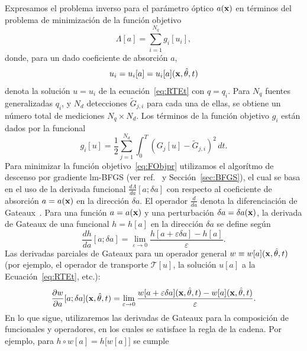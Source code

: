Expresamos el problema inverso para el parámetro óptico  $a(\mathbf{x})$ 
en términos del problema de minimización de la función objetivo
\begin{equation}
  \Lambda[a]=\sum_{i=1}^{N_q} g_i[u_i],
\label{eq:FObjpr}
\end{equation}
donde, para un dado coeficiente de absorción $a$,
\begin{equation}\label{ui_of_a}
  u_i = u_i[a] = u_i[a](\mathbf{x},\hat{\theta},t)
\label{eq:FObjpr2}
\end{equation}
denota la solución $u=u_i$ de la ecuación~\eqref{eq:RTEt} con $q=q_i$. Para $N_q$ fuentes generalizadas $q_i$, y $N_d$ 
detecciones $\tilde{G}_{j,i}$ para cada una de ellas, se obtiene un número 
total de mediciones $N_q \times N_d$. Los términos 
de la función objetivo $g_i$ están dados por la funcional 
\begin{equation}
  g_i[u] = \frac{1}{2} \sum_{j=1}^{N_d} \int_0^T (G_j[u]-\tilde
  {G}_{j,i})^2 \, dt.
\label{eq:FObj}
\end{equation}
Para minimizar la función objetivo~\eqref{eq:FObjpr} utilizamos el algorítmo 
de descenso por gradiente 
lm-BFGS (ver ref.~\cite{Byrd1995} y Sección~\ref{sec:BFGS}), 
el cual se basa en el uso de la derivada funcional $\frac{d\Lambda}{da} [a;\delta a]$ 
con respecto al coeficiente de absorción $a = a(\mathbf{x})$ en la dirección $\delta a$. 
El operador $\frac{d}{da}$ denota la diferenciación de Gateaux~\cite{Hille1974}. 
Para una función $a= a(\mathbf{x})$ y una perturbación $\delta a= \delta a(\mathbf{x})$, 
la derivada de Gateaux de una funcional $h = h[a]$ en la dirección $\delta a$ se define según
\begin{equation}\label{gateaux}
  \frac{dh}{da}[a; \delta a ] = \lim_{\varepsilon \to 0} \frac{h[a +\varepsilon \delta a]
    - h[a]}{\varepsilon}.
\end{equation}
Las derivadas parciales de Gateaux para un 
operador general $w \equiv w[a](\mathbf{x},\hat{\theta},t)$ (por ejemplo, el operador de transporte $\mathcal{T}[u]$, 
la solución $u[a]$ a la Ecuación~\eqref{eq:RTEt}, etc.):
\begin{equation}\label{gateaux_part}
  \frac{\partial w}{\partial a}[a; \delta a ](\mathbf{x},\hat{\theta},t) = \lim_{\varepsilon \to 0} \frac{w[a +\varepsilon \delta a](\mathbf{x},\hat{\theta},t)
    - w[a](\mathbf{x},\hat{\theta},t)}{\varepsilon}.
\end{equation}
En lo que sigue, utilizaremos las derivadas de Gateaux para la composición 
de funcionales y operadores, en los cuales se satisface la regla de la cadena. 
Por ejemplo, para  $h\circ w [a] = h\big[w[a]\big]$ 
se cumple
